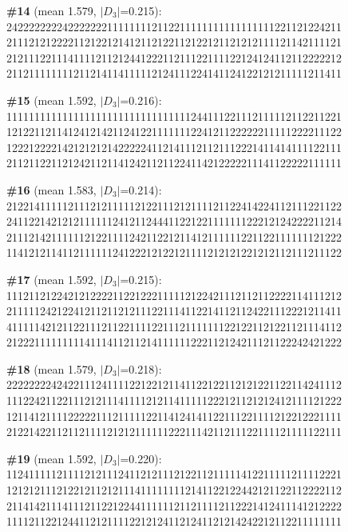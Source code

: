 \documentclass[10pt]{article}
\begin{document}
\noindent\textbf{\#14} (mean 1.579, $|D_3|$=0.215):\\
242222222242222222111111112112211111111111111111221121224211\\
211121212222112122121412112122112122121121212111121142111121\\
212111221114111121121244122211211122111122124124112112222212\\
211211111111211214114111112124111224141124122121211111211411\medskip

\noindent\textbf{\#15} (mean 1.592, $|D_3|$=0.216):\\
111111111111111111111111111111111244111221112111112112211221\\
121221121141241214211241221111111224121122222211111222211122\\
122212222142121212142222241121411121121112221411414111122111\\
211211221121242112114124211211224114212222211141122222111111\medskip

\noindent\textbf{\#16} (mean 1.583, $|D_3|$=0.214):\\
212214111112111212111112122111212111121122414224112111221122\\
241122142121211111124121124441122122111111122212124222211214\\
211121421111112122111124211221211412111111221122111111121222\\
114121211411211111124122212122121111212121221212112111211122\medskip

\noindent\textbf{\#17} (mean 1.592, $|D_3|$=0.215):\\
111211212242121222211221222111112122421112112112222114111212\\
211111242122412112112121112211141122141121124221112221211411\\
411111421211221112112211112211121111111221221121221121114112\\
212221111111114111411211214111111222112124211121122242421222\medskip

\noindent\textbf{\#18} (mean 1.579, $|D_3|$=0.218):\\
222222224242211124111122122121141122122112121221122114241112\\
111224211221112121114111121211411111222121121212412111121222\\
121141211112222211121111122114124141122111221111212212221111\\
212214221121121111212121111112221114211211122111121111122111\medskip

\noindent\textbf{\#19} (mean 1.592, $|D_3|$=0.220):\\
112411111211112121112411212111212211211111412211111211112221\\
121212111212212112121114111111112141122122442121122112222112\\
211414211141112112212244111111211211112112221412411141212222\\
111121122124411212111122121241121241121214242212112211111111\medskip
\end{document}
